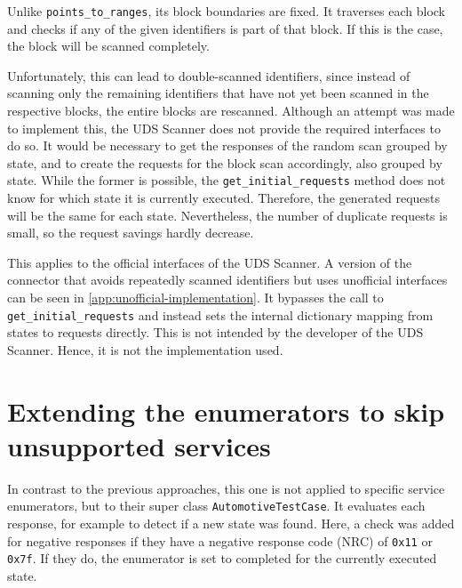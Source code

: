 Unlike \texttt{points_to_ranges}, its block boundaries are fixed. It traverses each block and checks if any of the given identifiers is part of that block. If this is the case, the block will be scanned completely.

Unfortunately, this can lead to double-scanned identifiers, since instead of scanning only the remaining identifiers that have not yet been scanned in the respective blocks, the entire blocks are rescanned. Although an attempt was made to implement this, the UDS Scanner does not provide the required interfaces to do so. It would be necessary to get the responses of the random scan grouped by state, and to create the requests for the block scan accordingly, also grouped by state. While the former is possible, the \texttt{get_initial_requests} method does not know for which state it is currently executed. Therefore, the generated requests will be the same for each state. Nevertheless, the number of duplicate requests is small, so the request savings hardly decrease.

This applies to the official interfaces of the UDS Scanner. A version of the connector that avoids repeatedly scanned identifiers but uses unofficial interfaces can be seen in \autoref{app:unofficial-implementation}. It bypasses the call to \texttt{get_initial_requests} and instead sets the internal dictionary mapping from states to requests directly. This is not intended by the developer of the UDS Scanner. Hence, it is not the implementation used.

\newpage

\section{Extending the enumerators to skip unsupported services}

In contrast to the previous approaches, this one is not applied to specific service enumerators, but to their super class \texttt{AutomotiveTestCase}. It evaluates each response, for example to detect if a new state was found. Here, a check was added for negative responses if they have a negative response code (NRC) of \texttt{0x11} or \texttt{0x7f}. If they do, the enumerator is set to completed for the currently executed state.

